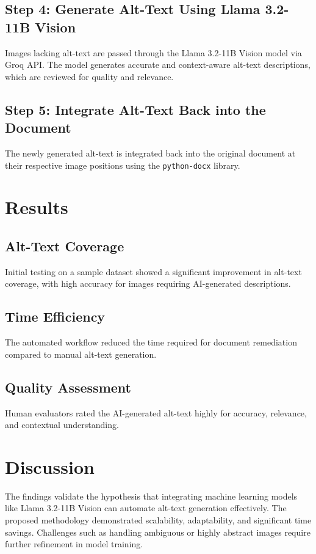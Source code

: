 \documentclass[12pt]{article}
\begin{document}
\subsection*{Step 4: Generate Alt-Text Using Llama 3.2-11B Vision}
Images lacking alt-text are passed through the Llama 3.2-11B Vision model via Groq API. The model generates accurate and context-aware alt-text descriptions, which are reviewed for quality and relevance.

\subsection*{Step 5: Integrate Alt-Text Back into the Document}
The newly generated alt-text is integrated back into the original document at their respective image positions using the \texttt{python-docx} library.

\section{Results}
\subsection{Alt-Text Coverage}
Initial testing on a sample dataset showed a significant improvement in alt-text coverage, with high accuracy for images requiring AI-generated descriptions.

\subsection{Time Efficiency}
The automated workflow reduced the time required for document remediation compared to manual alt-text generation.

\subsection{Quality Assessment}
Human evaluators rated the AI-generated alt-text highly for accuracy, relevance, and contextual understanding.

\section{Discussion}
The findings validate the hypothesis that integrating machine learning models like Llama 3.2-11B Vision can automate alt-text generation effectively. The proposed methodology demonstrated scalability, adaptability, and significant time savings. Challenges such as handling ambiguous or highly abstract images require further refinement in model training.
\end{document}
